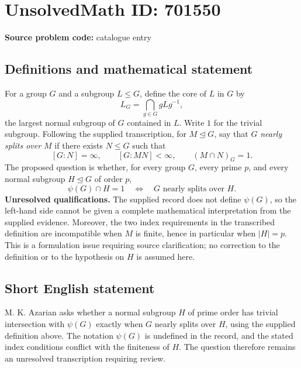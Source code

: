 \documentclass[11pt]{article}
\begin{document}
\section*{UnsolvedMath ID: 701550}
\textbf{Source problem code:} catalogue entry
\subsection{Definitions and mathematical statement}
For a group \(G\) and a subgroup \(L\leq G\), define the core of \(L\) in \(G\) by
\[
L_G=\bigcap_{g\in G}gLg^{-1},
\]
the largest normal subgroup of \(G\) contained in \(L\). Write \(1\) for the trivial subgroup. Following the supplied transcription, for \(M\trianglelefteq G\), say that \(G\) \emph{nearly splits over \(M\)} if there exists \(N\leq G\) such that
\[
[G:N]=\infty,\qquad [G:MN]<\infty,\qquad (M\cap N)_G=1.
\]
The proposed question is whether, for every group \(G\), every prime \(p\), and every normal subgroup \(H\trianglelefteq G\) of order \(p\),
\[
\psi(G)\cap H=1
\quad\Longleftrightarrow\quad
G\text{ nearly splits over }H.
\]
\textbf{Unresolved qualifications.} The supplied record does not define \(\psi(G)\), so the left-hand side cannot be given a complete mathematical interpretation from the supplied evidence. Moreover, the two index requirements in the transcribed definition are incompatible when \(M\) is finite, hence in particular when \(|H|=p\). This is a formulation issue requiring source clarification; no correction to the definition or to the hypothesis on \(H\) is assumed here.
\subsection{Short English statement}
M. K. Azarian asks whether a normal subgroup \(H\) of prime order has trivial intersection with \(\psi(G)\) exactly when \(G\) nearly splits over \(H\), using the supplied definition above. The notation \(\psi(G)\) is undefined in the record, and the stated index conditions conflict with the finiteness of \(H\). The question therefore remains an unresolved transcription requiring review.
\end{document}
